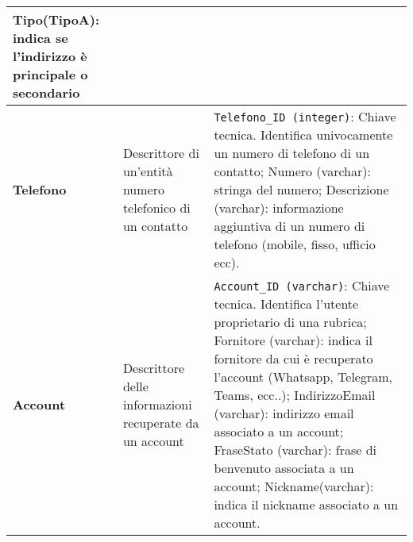\begin{longtable}{p{}p{}p{}}
Tipo(TipoA): indica se l’indirizzo è principale o secondario
\\ \midrule
\textbf{Telefono} &
Descrittore di un'entità numero telefonico di un contatto &
\verb|Telefono_ID (integer)|: Chiave tecnica. Identifica univocamente un numero di telefono di un contatto; \newline
Numero (varchar): stringa del numero;\newline
Descrizione (varchar): informazione aggiuntiva di un numero di telefono (mobile, fisso, ufficio ecc).
\\ \midrule
\textbf{Account} &
Descrittore delle informazioni recuperate da un account &
\verb|Account_ID (varchar)|: Chiave tecnica. Identifica l’utente proprietario di una rubrica;\newline
Fornitore (varchar): indica il fornitore da cui è recuperato l'account (Whatsapp, Telegram, Teams, ecc..);\newline
IndirizzoEmail (varchar): indirizzo email associato a un account;\newline
FraseStato (varchar): frase di benvenuto associata a un account;\newline
Nickname(varchar): indica il nickname associato a un account.
\\ \bottomrule
\end{longtable}
